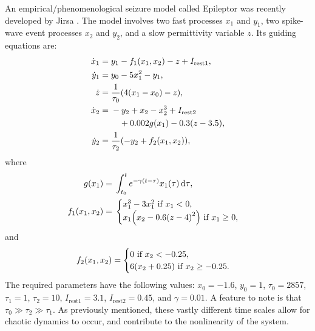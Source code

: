 An empirical/phenomenological seizure model called Epileptor was recently developed by Jirsa \etal \cite{Jirsa2014,Jirsa2017}.
The model involves two fast processes $x_{1}$ and $y_{1}$, two spike-wave event processes $x_{2}$ and $y_{2}$, and a slow permittivity variable $z$.
Its guiding equations are:
\begin{align}
  \label{eq:epileptor_x1}
  \dot{x}_{1}
  ={}&
    y_{1}
    -
    f_{1}(x_{1}, x_{2})
    -
    z
    +
    I_{\text{rest} 1}, \\
  \label{eq:epileptor_y1}
  \dot{y}_{1}
  ={}&
    y_{0}
    -
    5 x_{1}^{2}
    -
    y_{1}, \\
  \label{eq:epileptor_z}
  \dot{z}
  ={}&
    \frac{1}{\tau_{0}} \pqty{4 \pqty{x_{1} - x_{0}} - z}, \\
  \label{eq:epileptor_x2}
  \dot{x}_{2}
  ={}&
    -y_{2}
    +
    x_{2}
    -
    x_{2}^{3}
    +
    I_{\text{rest} 2} \\
    &{}\quad +
    0.002 g(x_{1})
    -
    0.3 \pqty{z - 3.5}, \\
  \label{eq:epileptor_y2}
  \dot{y}_{2}
  ={}&
    \frac{1}{\tau_{2}} \pqty{-y_{2} + f_{2}(x_{1}, x_{2})},
\end{align}
where
\begin{align}
  \label{eq:epileptor_g}
  g(x_{1})
  ={}&
    \int_{t_{0}}^{t}{e^{-\gamma \pqty{t - \tau}} x_{1}(\tau) \dd{\tau}}, \\
  \label{eq:epileptor_f1}
  f_{1}(x_{1}, x_{2})
  ={}&
    \begin{cases}
      x_{1}^{3} - 3 x_{1}^{2}
      \text{ if } x_{1} < 0, \\
      x_{1} \pqty{x_{2} - 0.6 \pqty{z - 4}^{2}}
      \text{ if }
      x_{1} \geq 0,
    \end{cases}
\end{align}
and
\begin{equation}
  \label{eq:epileptor_f2}
  f_{2}(x_{1}, x_{2})
  =
    \begin{cases}
      0
      \text{ if } x_{2} < -0.25, \\
      6 \pqty{x_{2} + 0.25}
      \text{ if } x_{2} \geq -0.25.
    \end{cases}
\end{equation}
The required parameters have the following values: $x_{0} = -1.6$, $y_{0} = 1$, $\tau_{0} = 2857$, $\tau_{1} = 1$, $\tau_{2} = 10$, $I_{\text{rest} 1} = 3.1$, $I_{\text{rest} 2} = 0.45$, and $\gamma = 0.01$.
A feature to note is that $\tau_{0} \gg \tau_{2} \gg \tau_{1}$.
As previously mentioned, these vastly different time scales allow for chaotic dynamics to occur, and contribute to the nonlinearity of the system.

